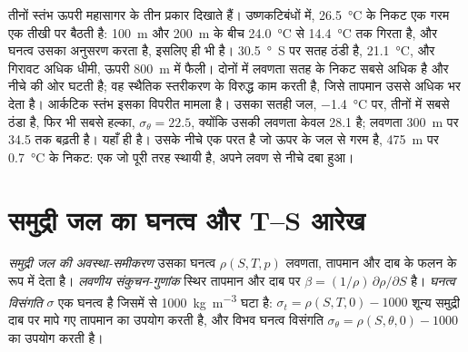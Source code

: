 तीनों स्तंभ ऊपरी महासागर के तीन प्रकार दिखाते हैं। उष्णकटिबंधों में, \qty{26.5}{\celsius} के निकट एक गरम  एक तीखी  पर बैठती है: \qty{100}{m} और \qty{200}{m} के बीच  \qty{24.0}{\celsius} से \qty{14.4}{\celsius} तक गिरता है, और घनत्व उसका अनुसरण करता है, इसलिए  ही  भी है। \qty{30.5}{\degree S} पर सतह ठंडी है, \qty{21.1}{\celsius}, और गिरावट अधिक धीमी, ऊपरी \qty{800}{m} में फैली। दोनों में लवणता सतह के निकट सबसे अधिक है और नीचे की ओर घटती है; वह स्थैतिक स्तरीकरण के विरुद्ध काम करती है, जिसे तापमान उससे अधिक भर देता है। आर्कटिक स्तंभ इसका विपरीत मामला है। उसका सतही जल, \qty{-1.4}{\celsius} पर, तीनों में सबसे ठंडा है, फिर भी सबसे हल्का, $\sigma_\theta = 22.5$, क्योंकि उसकी लवणता केवल \num{28.1} है; लवणता \qty{300}{m} पर \num{34.5} तक बढ़ती है। यहाँ  ही  है। उसके नीचे एक परत है जो ऊपर के जल से गरम है, \qty{475}{m} पर \qty{0.7}{\celsius} के निकट: एक  जो पूरी तरह स्थायी है, अपने लवण से नीचे दबा हुआ।

\section{समुद्री जल का घनत्व और T–S आरेख}\label{sec:b1:fluid-envelopes-structure:ts}

\begin{definition}\label{def:b1:fluid-envelopes-structure:eos}
\emph{समुद्री जल की अवस्था-समीकरण} उसका घनत्व $\rho(S, T, p)$ लवणता, तापमान और दाब के फलन के रूप में देता है। \emph{लवणीय संकुचन-गुणांक} स्थिर तापमान और दाब पर $\beta = (1/\rho)\,\partial\rho/\partial S$ है। \emph{घनत्व विसंगति} $\sigma$ एक घनत्व है जिसमें से \qty{1000}{kg.m^{-3}} घटा है: $\sigma_t = \rho(S, T, 0) -
1000$ शून्य समुद्री दाब पर मापे गए तापमान का उपयोग करती है, और विभव घनत्व विसंगति $\sigma_\theta = \rho(S, \theta, 0) - 1000$  का उपयोग करती है।
\end{definition}

